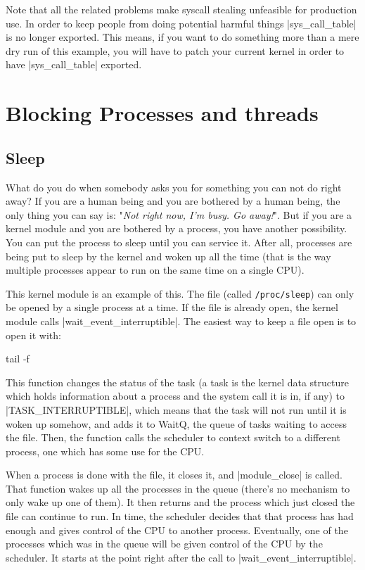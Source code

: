 \documentclass[10pt, oneside]{book}
\begin{document}
Note that all the related problems make syscall stealing unfeasible for production use.
In order to keep people from doing potential harmful things \cpp|sys_call_table| is no longer exported.
This means, if you want to do something more than a mere dry run of this example, you will have to patch your current kernel in order to have \cpp|sys_call_table| exported.


\section{Blocking Processes and threads}
\label{sec:blocking_process_thread}
\subsection{Sleep}
\label{sec:sleep}
What do you do when somebody asks you for something you can not do right away?
If you are a human being and you are bothered by a human being, the only thing you can say is: "\emph{Not right now, I'm busy. Go away!}".
But if you are a kernel module and you are bothered by a process, you have another possibility.
You can put the process to sleep until you can service it.
After all, processes are being put to sleep by the kernel and woken up all the time (that is the way multiple processes appear to run on the same time on a single CPU).

This kernel module is an example of this.
The file (called \verb|/proc/sleep|) can only be opened by a single process at a time.
If the file is already open, the kernel module calls \cpp|wait_event_interruptible|.
The easiest way to keep a file open is to open it with:

\begin{codebash}
tail -f
\end{codebash}

This function changes the status of the task (a task is the kernel data structure which holds information about a process and the system call it is in,
if any) to \cpp|TASK_INTERRUPTIBLE|, which means that the task will not run until it is woken up somehow, and adds it to WaitQ, the queue of tasks waiting to access the file.
Then, the function calls the scheduler to context switch to a different process, one which has some use for the CPU.

When a process is done with the file, it closes it, and \cpp|module_close| is called.
That function wakes up all the processes in the queue (there's no mechanism to only wake up one of them).
It then returns and the process which just closed the file can continue to run.
In time, the scheduler decides that that process has had enough and gives control of the CPU to another process.
Eventually, one of the processes which was in the queue will be given control of the CPU by the scheduler.
It starts at the point right after the call to \cpp|wait_event_interruptible|.
\end{document}

